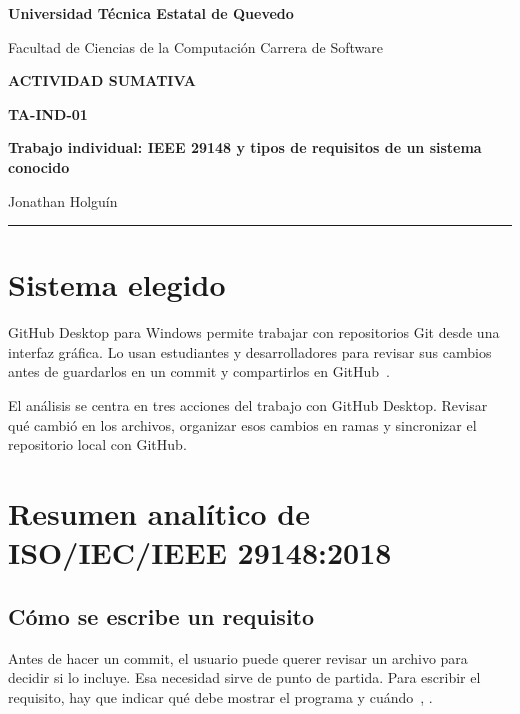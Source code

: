 \documentclass[11pt,a4paper]{article}
\newcommand{\estudiante}{Jonathan Holguín}
\begin{document}
\begin{center}
  {\Large\bfseries\color{VerdeUteq} Universidad Técnica Estatal de Quevedo\par}
  \vspace{0.3em}
  {\small Facultad de Ciencias de la Computación
    \textcolor{Dorado}{\textbullet} Carrera de Software\par}
  \vspace{1em}
  {\large\bfseries\color{AzulTitulo} ACTIVIDAD SUMATIVA\par}
  \vspace{0.25em}
  {\large\bfseries TA-IND-01\par}
  {\Large\bfseries\color{VerdeUteq}
    Trabajo individual: IEEE 29148 y tipos de requisitos de un sistema conocido\par}
  \vspace{0.6em}
  {\normalsize \estudiante\par}
\end{center}
\noindent\textcolor{Dorado}{\rule{\linewidth}{0.8pt}}

\section{Sistema elegido}

GitHub Desktop para Windows permite trabajar con repositorios Git desde una
interfaz gráfica. Lo usan estudiantes y desarrolladores para revisar sus
cambios antes de guardarlos en un commit y compartirlos en
GitHub~\cite{githubDesktop}.

El análisis se centra en tres acciones del trabajo con GitHub Desktop.
Revisar qué cambió en los archivos, organizar esos cambios en ramas y
sincronizar el repositorio local con GitHub.

\section{Resumen analítico de ISO/IEC/IEEE 29148:2018}

\subsection*{Cómo se escribe un requisito}

Antes de hacer un commit, el usuario puede querer revisar un archivo para
decidir si lo incluye. Esa necesidad sirve de punto de partida. Para
escribir el requisito, hay que indicar qué debe mostrar el programa y
cuándo~\cite[Sec. 5.2.3]{iso29148}, \cite[Sec. 5.2.4]{iso29148}.
\end{document}
